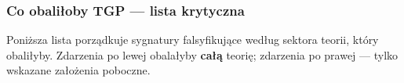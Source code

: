 \subsubsection{Co obali\l{}oby TGP --- lista krytyczna}
\label{sssec:co-obalic}

\begin{remark}\label{rem:falsification-hierarchy-formalizm}
Poni\.zsza lista porz\k{a}dkuje sygnatury falsyfikuj\k{a}ce wed\l{}ug
sektora teorii, kt\'ory obali\l{}yby. Zdarzenia po lewej
obala\l{}yby \textbf{ca\l{}\k{a}} teori\k{e}; zdarzenia po prawej ---
tylko wskazane za\l{}o\.zenia poboczne.
\end{remark}

